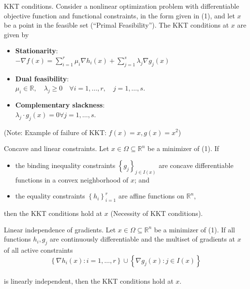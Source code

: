 \begin{definition}[L7.1]{KKT conditions.}
    Consider a nonlinear optimization problem with differentiable objective function and functional constraints, in the form given in (1), and let $x$ be a point in the feasible set (``Primal Feasibility''). The KKT conditions at $x$ are given by
    \begin{itemize}[leftmargin=*]
        \item \textbf{Stationarity}:\\
        $-\nabla f(x)=\sum_{i=1}^r \mu_i \nabla h_i(x)+\sum_{j=1}^s \lambda_j \nabla g_j(x)$
        \vspace{-2pt}\\
        \item \textbf{Dual feasibility}:\\
        $\mu_i \in \mathbb{R}, \quad \lambda_j \geq 0 \quad \forall i=1, \ldots, r, \quad j=1, \ldots, s .$
        \vspace{-2pt}\\
        \item \textbf{Complementary slackness}:\\
        $\lambda_j \cdot g_j(x) =0 \forall j=1, \ldots, s .$
    \end{itemize}
    (Note: Example of failure of KKT: $f(x) = x, g(x) = x^2$)
\end{definition}



\begin{theorem}[L7.2]{Concave and linear constraints.}
    Let $x \in \Omega \subseteq \mathbb{R}^n$ be a minimizer of (1). If
    \begin{itemize}[leftmargin=*]
        \item the binding inequality constraints $\left\{g_j\right\}_{j \in I(x)}$ are concave differentiable functions in a convex neighborhood of $x$; and
        \item the equality constraints $\left\{h_i\right\}_{i=1}^r$ are affine functions on $\mathbb{R}^n$, 
    \end{itemize}
    then the KKT conditions hold at $x$ (Necessity of KKT conditions).
\end{theorem}


\begin{theorem}[L7.3]{Linear independence of gradients.}
    Let $x \in \Omega \subseteq \mathbb{R}^n$ be a minimizer of (1). If all functions $h_i, g_j$ are continuously differentiable and the multiset of gradients at $x$ of all active constraints
    \vspace{-4pt}\\
    $$
    \left\{\nabla h_i(x): i=1, \ldots, r\right\} \cup\left\{\nabla g_j(x): j \in I(x)\right\}
    $$
    \vspace{-4pt}\\
    is linearly independent, then the KKT conditions hold at $x$.
\end{theorem}

